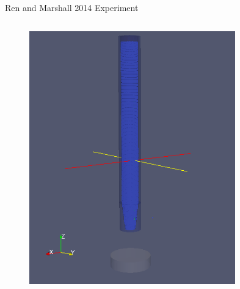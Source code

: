 \begin{frame}{\thesec}{Ren and Marshall 2014 Experiment}
  \vspace*{-2.1\baselineskip}
  \begin{columns}
    \begin{column}{0.45\textwidth}
      \begin{figure}
        \centering
        \includegraphics[width=\textwidth]{img/ren_marshall_start.png}
      \end{figure}
    \end{column}
    \begin{column}{0.45\textwidth}
      \begin{figure}
        \centering

\end{figure}
\end{column}
\end{columns}
\end{frame}
